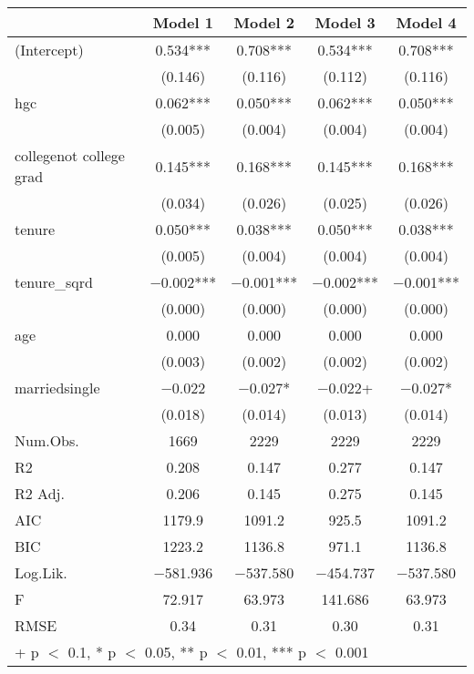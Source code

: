 \documentclass[12pt]{article}
\begin{document}
\begin{table}
\centering
\begin{tabular}[t]{lcccc}
\toprule
  & Model 1 & Model 2 & Model 3 & Model 4\\
\midrule
(Intercept) & \num{0.534}*** & \num{0.708}*** & \num{0.534}*** & \num{0.708}***\\
 & (\num{0.146}) & (\num{0.116}) & (\num{0.112}) & (\num{0.116})\\
hgc & \num{0.062}*** & \num{0.050}*** & \num{0.062}*** & \num{0.050}***\\
 & (\num{0.005}) & (\num{0.004}) & (\num{0.004}) & \vphantom{1} (\num{0.004})\\
collegenot college grad & \num{0.145}*** & \num{0.168}*** & \num{0.145}*** & \num{0.168}***\\
 & (\num{0.034}) & (\num{0.026}) & (\num{0.025}) & (\num{0.026})\\
tenure & \num{0.050}*** & \num{0.038}*** & \num{0.050}*** & \num{0.038}***\\
 & (\num{0.005}) & (\num{0.004}) & (\num{0.004}) & (\num{0.004})\\
tenure\_sqrd & \num{-0.002}*** & \num{-0.001}*** & \num{-0.002}*** & \num{-0.001}***\\
 & (\num{0.000}) & (\num{0.000}) & (\num{0.000}) & (\num{0.000})\\
age & \num{0.000} & \num{0.000} & \num{0.000} & \num{0.000}\\
 & (\num{0.003}) & (\num{0.002}) & (\num{0.002}) & (\num{0.002})\\
marriedsingle & \num{-0.022} & \num{-0.027}* & \num{-0.022}+ & \num{-0.027}*\\
 & (\num{0.018}) & (\num{0.014}) & (\num{0.013}) & (\num{0.014})\\
\midrule
Num.Obs. & \num{1669} & \num{2229} & \num{2229} & \num{2229}\\
R2 & \num{0.208} & \num{0.147} & \num{0.277} & \num{0.147}\\
R2 Adj. & \num{0.206} & \num{0.145} & \num{0.275} & \num{0.145}\\
AIC & \num{1179.9} & \num{1091.2} & \num{925.5} & \num{1091.2}\\
BIC & \num{1223.2} & \num{1136.8} & \num{971.1} & \num{1136.8}\\
Log.Lik. & \num{-581.936} & \num{-537.580} & \num{-454.737} & \num{-537.580}\\
F & \num{72.917} & \num{63.973} & \num{141.686} & \num{63.973}\\
RMSE & \num{0.34} & \num{0.31} & \num{0.30} & \num{0.31}\\
\bottomrule
\multicolumn{5}{l}{\rule{0pt}{1em}+ p $<$ 0.1, * p $<$ 0.05, ** p $<$ 0.01, *** p $<$ 0.001}\\
\end{tabular}
\end{table}
\end{document}
